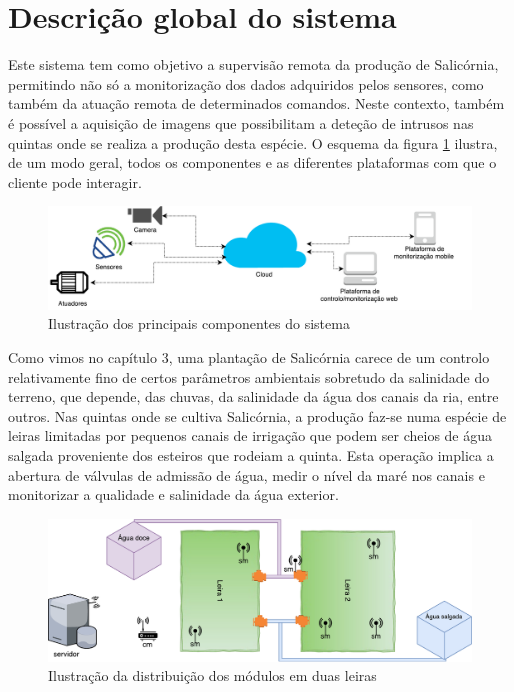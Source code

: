\section{Descrição global do sistema}

Este sistema tem como objetivo a supervisão remota da produção de Salicórnia, permitindo não só a monitorização dos dados adquiridos pelos sensores, como também da atuação remota de determinados comandos. Neste contexto, também é possível a aquisição de imagens que possibilitam a deteção de intrusos nas quintas onde se realiza a produção desta espécie. O esquema da figura \ref{componentesalla} ilustra, de um modo geral, todos os componentes e as diferentes plataformas com que o cliente pode interagir. 


\begin{figure}[!htb]
	\centering
	\includegraphics[width=\linewidth]{esquemas/global_arquitetura.pdf}
	\caption{Ilustração dos principais componentes do sistema}
	\label{componentesalla}
\end{figure}






Como vimos no capítulo 3, uma plantação de  Salicórnia carece de um controlo relativamente fino de certos parâmetros ambientais sobretudo da salinidade do terreno, que depende, das chuvas, da salinidade da água dos canais da ria, entre outros. Nas quintas onde se cultiva Salicórnia, a produção faz-se numa espécie de leiras limitadas por pequenos canais de irrigação que podem ser cheios de água salgada proveniente dos esteiros que rodeiam a quinta. Esta operação implica a abertura de válvulas de admissão de água, medir o nível da maré nos canais e monitorizar a qualidade e salinidade da água exterior.



\begin{figure}[!htb]
	\centering
	\includegraphics[width=\linewidth]{esquemas/leiras-comm-geral.pdf}
	\caption{Ilustração da distribuição dos módulos em duas leiras}
	\label{leira}
\end{figure}


